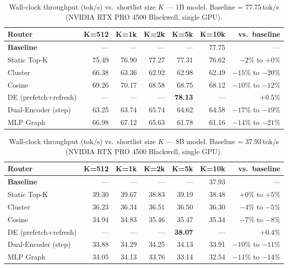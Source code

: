 \documentclass[twocolumn,10pt]{article}
\newcommand{\tblhead}[1]{\textbf{#1}}
\begin{document}
\begin{table}[t]
\centering
\caption{Wall-clock throughput (tok/s) vs.\ shortlist size $K$ --- 1B model.
         Baseline = 77.75\,tok/s (NVIDIA RTX PRO 4500 Blackwell, single GPU).}
\label{tab:throughput}
\small
\begin{tabular}{@{}lrrrrrr@{}}
\toprule
\tblhead{Router} & \tblhead{K=512} & \tblhead{K=1k} & \tblhead{K=2k} & \tblhead{K=5k} & \tblhead{K=10k} & \tblhead{vs.\ baseline} \\
\midrule
\textbf{Baseline} & --- & --- & --- & --- & 77.75 & --- \\
Static Top-K      & 75.49 & 76.90 & 77.27 & 77.31 & 76.62 & $-2\%$ to $+0\%$ \\
Cluster           & 66.38 & 63.36 & 62.92 & 62.98 & 62.49 & $-15\%$ to $-20\%$ \\
Cosine            & 69.26 & 70.17 & 68.58 & 68.75 & 68.12 & $-10\%$ to $-12\%$ \\
DE (prefetch+refresh) & --- & --- & --- & \textbf{78.13} & --- & $\mathbf{+0.5\%}$ \\
Dual-Encoder (step)   & 63.25 & 63.74 & 65.74 & 64.62 & 64.58 & $-17\%$ to $-19\%$ \\
MLP Graph         & 66.98 & 67.12 & 65.63 & 61.78 & 61.16 & $-14\%$ to $-21\%$ \\
\bottomrule
\end{tabular}
\end{table}

\begin{table}[t]
\centering
\caption{Wall-clock throughput (tok/s) vs.\ shortlist size $K$ --- 8B model.
         Baseline = 37.93\,tok/s (NVIDIA RTX PRO 4500 Blackwell, single GPU).}
\label{tab:throughput-8b}
\small
\begin{tabular}{@{}lrrrrrr@{}}
\toprule
\tblhead{Router} & \tblhead{K=512} & \tblhead{K=1k} & \tblhead{K=2k} & \tblhead{K=5k} & \tblhead{K=10k} & \tblhead{vs.\ baseline} \\
\midrule
\textbf{Baseline} & --- & --- & --- & --- & 37.93 & --- \\
Static Top-K      & 39.30 & 39.67 & 38.83 & 39.19 & 38.48 & $+0\%$ to $+5\%$ \\
Cluster           & 36.23 & 36.34 & 36.51 & 36.50 & 36.30 & $-4\%$ to $-5\%$ \\
Cosine            & 34.94 & 34.83 & 35.46 & 35.47 & 35.34 & $-7\%$ to $-8\%$ \\
DE (prefetch+refresh) & --- & --- & --- & \textbf{38.07} & --- & $\mathbf{+0.4\%}$ \\
Dual-Encoder (step)   & 33.88 & 34.29 & 34.25 & 34.13 & 33.91 & $-10\%$ to $-11\%$ \\
MLP Graph         & 34.05 & 34.13 & 33.76 & 33.14 & 32.54 & $-11\%$ to $-14\%$ \\
\bottomrule
\end{tabular}
\end{table}
\end{document}
